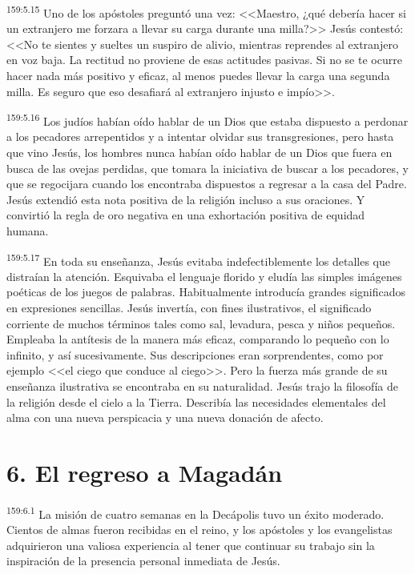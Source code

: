 \par 
\textsuperscript{159:5.15} Uno de los apóstoles preguntó una vez: <<Maestro, ¿qué debería hacer si un extranjero me forzara a llevar su carga durante una milla?>> Jesús contestó: <<No te sientes y sueltes un suspiro de alivio, mientras reprendes al extranjero en voz baja. La rectitud no proviene de esas actitudes pasivas. Si no se te ocurre hacer nada más positivo y eficaz, al menos puedes llevar la carga una segunda milla. Es seguro que eso desafiará al extranjero injusto e impío>>.

\par 
\textsuperscript{159:5.16} Los judíos habían oído hablar de un Dios que estaba dispuesto a perdonar a los pecadores arrepentidos y a intentar olvidar sus transgresiones, pero hasta que vino Jesús, los hombres nunca habían oído hablar de un Dios que fuera en busca de las ovejas perdidas, que tomara la iniciativa de buscar a los pecadores, y que se regocijara cuando los encontraba dispuestos a regresar a la casa del Padre. Jesús extendió esta nota positiva de la religión incluso a sus oraciones. Y convirtió la regla de oro negativa en una exhortación positiva de equidad humana.

\par 
\textsuperscript{159:5.17} En toda su enseñanza, Jesús evitaba indefectiblemente los detalles que distraían la atención. Esquivaba el lenguaje florido y eludía las simples imágenes poéticas de los juegos de palabras. Habitualmente introducía grandes significados en expresiones sencillas. Jesús invertía, con fines ilustrativos, el significado corriente de muchos términos tales como sal, levadura, pesca y niños pequeños. Empleaba la antítesis de la manera más eficaz, comparando lo pequeño con lo infinito, y así sucesivamente. Sus descripciones eran sorprendentes, como por ejemplo <<el ciego que conduce al ciego>>. Pero la fuerza más grande de su enseñanza ilustrativa se encontraba en su naturalidad. Jesús trajo la filosofía de la religión desde el cielo a la Tierra. Describía las necesidades elementales del alma con una nueva perspicacia y una nueva donación de afecto.

\section*{6. El regreso a Magadán}
\par 
\textsuperscript{159:6.1} La misión de cuatro semanas en la Decápolis tuvo un éxito moderado. Cientos de almas fueron recibidas en el reino, y los apóstoles y los evangelistas adquirieron una valiosa experiencia al tener que continuar su trabajo sin la inspiración de la presencia personal inmediata de Jesús.

